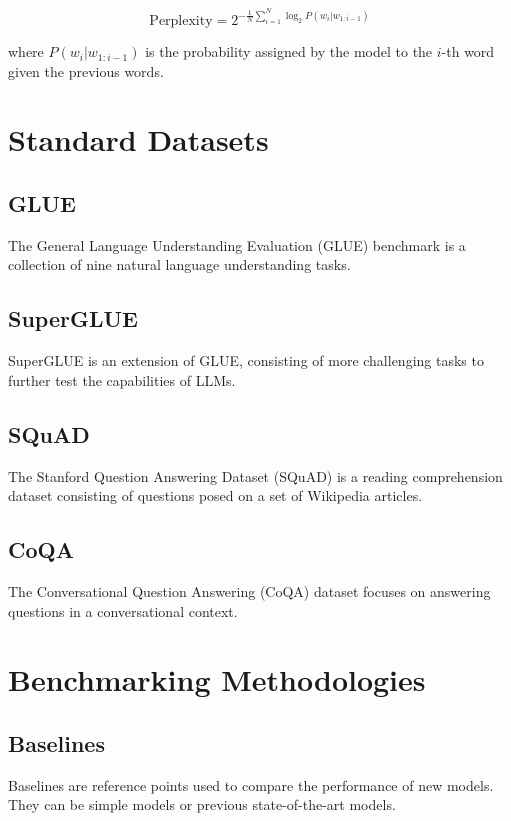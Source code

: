 \begin{equation}
\text{Perplexity} = 2^{-\frac{1}{N} \sum_{i=1}^N \log_2 P(w_i | w_{1:i-1})}
\end{equation}

where \( P(w_i | w_{1:i-1}) \) is the probability assigned by the model to the \( i \)-th word given the previous words.

\section{Standard Datasets}

\subsection{GLUE}
The General Language Understanding Evaluation (GLUE) benchmark is a collection of nine natural language understanding tasks.

\subsection{SuperGLUE}
SuperGLUE is an extension of GLUE, consisting of more challenging tasks to further test the capabilities of LLMs.

\subsection{SQuAD}
The Stanford Question Answering Dataset (SQuAD) is a reading comprehension dataset consisting of questions posed on a set of Wikipedia articles.

\subsection{CoQA}
The Conversational Question Answering (CoQA) dataset focuses on answering questions in a conversational context.

\section{Benchmarking Methodologies}

\subsection{Baselines}
Baselines are reference points used to compare the performance of new models. They can be simple models or previous state-of-the-art models.

